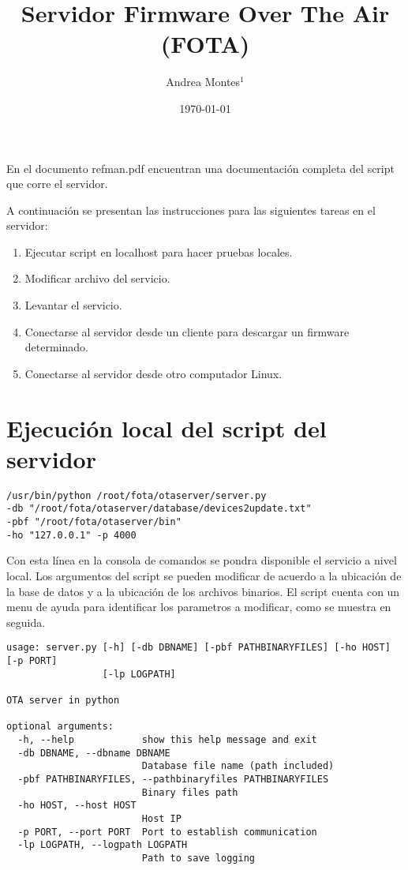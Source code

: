 \documentclass[11pt]{article}
\title{Servidor Firmware Over The Air (FOTA)}
\author{Andrea Montes$^1$}
\date{%
    \today
}
\begin{document}
\maketitle
En el documento refman.pdf encuentran una documentación completa del script que corre el servidor. 

A continuación se presentan las instrucciones para las siguientes tareas en el servidor:
\begin{enumerate}
\item Ejecutar script en localhost para hacer pruebas locales.
\item Modificar archivo del servicio.
\item Levantar el servicio.
\item Conectarse al servidor desde un cliente para descargar un firmware determinado.
\item Conectarse al servidor desde otro computador Linux.
\end{enumerate}

\section{Ejecución local del script del servidor}
\begin{verbatim}
/usr/bin/python /root/fota/otaserver/server.py 
-db "/root/fota/otaserver/database/devices2update.txt" 
-pbf "/root/fota/otaserver/bin" 
-ho "127.0.0.1" -p 4000
\end{verbatim}
Con esta línea en la consola de comandos se pondra disponible el servicio a nivel local. Los argumentos del script se pueden modificar de acuerdo a la ubicación de la base de datos y a la ubicación de los archivos binarios. El script cuenta con un menu de ayuda para identificar los parametros a modificar, como se muestra en seguida.
\begin{verbatim}
usage: server.py [-h] [-db DBNAME] [-pbf PATHBINARYFILES] [-ho HOST] [-p PORT]
                 [-lp LOGPATH]

OTA server in python

optional arguments:
  -h, --help            show this help message and exit
  -db DBNAME, --dbname DBNAME
                        Database file name (path included)
  -pbf PATHBINARYFILES, --pathbinaryfiles PATHBINARYFILES
                        Binary files path
  -ho HOST, --host HOST
                        Host IP
  -p PORT, --port PORT  Port to establish communication
  -lp LOGPATH, --logpath LOGPATH
                        Path to save logging

\end{verbatim}
\end{document}
